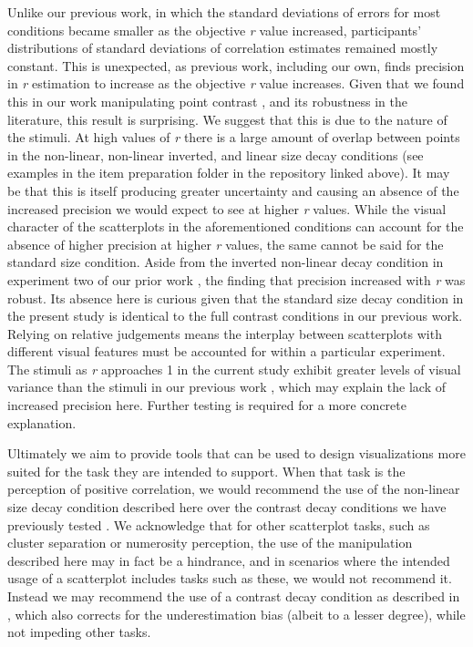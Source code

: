 \documentclass{vgtc}                          %
\begin{document}
Unlike our previous work, in which the standard deviations of errors for most
conditions became smaller as the objective \emph{r} value increased, participants'
distributions of standard deviations of correlation estimates remained mostly constant. This
is unexpected, as previous work, including our own, finds precision
in \emph{r} estimation to increase as the objective \emph{r} value increases. Given that we found
this in our work manipulating point contrast \cite{strain_2023}, and
its robustness in the literature, this result is surprising. We suggest that this
is due to the nature of the stimuli. At high values of \emph{r} there is a large amount
of overlap between points in the non-linear, non-linear inverted, and linear size decay conditions (see examples in the item preparation folder in the repository linked above). It may be that this
is itself producing greater uncertainty and causing an absence of the increased
precision we would expect to see at higher \emph{r} values. While the visual character
of the scatterplots in the aforementioned conditions can account for the absence
of higher precision at higher \emph{r} values, the same cannot be said for the standard size
condition. Aside from the inverted non-linear decay condition in experiment two of
our prior work \cite{strain_2023}, the finding that precision increased with \emph{r}
was robust. Its absence here is curious given that the standard size decay condition in
the present study is identical to the full contrast conditions in our previous work.
Relying on relative judgements means
the interplay between scatterplots with different visual features must be accounted
for within a particular experiment. The stimuli as \emph{r} approaches 1 in the current
study exhibit greater levels of visual variance than the stimuli in our previous work \cite{strain_2023},
which may explain the lack of increased precision here. Further testing is required
for a more concrete explanation.

Ultimately we aim to provide tools that can be used to design visualizations more suited for the task
they are intended to support. When that task is the perception of positive correlation, we would
recommend the use of the non-linear size decay condition described here over the contrast
decay conditions we have previously tested \cite{strain_2023}. We acknowledge that
for other scatterplot tasks, such as cluster separation or numerosity perception,
the use of the manipulation described here may in fact be a hindrance, and in scenarios
where the intended usage of a scatterplot includes tasks such as these, we would not
recommend it. Instead we may recommend the use of a contrast decay condition as described
in \cite{strain_2023}, which also corrects for the underestimation bias (albeit to a
lesser degree), while not impeding other tasks.
\end{document}
